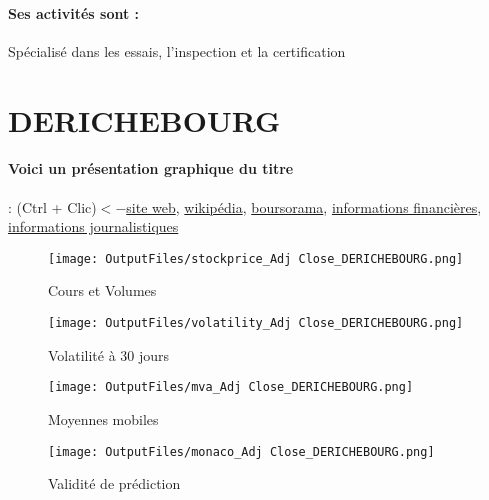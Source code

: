 \documentclass[11pt,a4paper]{report}%
\begin{document}
\paragraph{Ses activités sont : } Spécialisé dans les essais, l’inspection et la certification 
    
    \newpage

\section{DERICHEBOURG}

\paragraph{Voici un présentation graphique du titre} : (Ctrl + Clic)$<-$\href{https://www.derichebourg.com/fr/accueil/investisseurs/presentations}{site web}, \href{https://fr.wikipedia.org/wiki/Derichebourg}{wikipédia}, \href{https://www.boursorama.com/cours/1rPDBG}{boursorama}, \href{https://www.qwant.com/?q=site:https:%2f%2fwww.easybourse.com%2faction-societe%2fDERICHEBOURG&t=web&client=ext-firefox-hp}{informations financières}, \href{https://bourse.lerevenu.com/cours-de-bourse/fiche-valeur-synthese/DERICHEBOURG/DBG-FR}{informations journalistiques}
\begin{figure}[!htb]
   \begin{minipage}{0.5\textwidth}
     \centering
     \texttt{[image: OutputFiles/stockprice\_Adj Close\_DERICHEBOURG.png]}
     \caption{Cours et Volumes}\label{Fig:price_DERICHEBOURG}
   \end{minipage}\hfill
   \begin{minipage}{0.5\textwidth}
     \centering
     \texttt{[image: OutputFiles/volatility\_Adj Close\_DERICHEBOURG.png]}
     \caption{Volatilité à 30 jours}\label{Fig:volat_DERICHEBOURG}
   \end{minipage}
\end{figure}
\begin{figure}[!htb]
   \begin{minipage}{0.5\textwidth}
     \centering
     \texttt{[image: OutputFiles/mva\_Adj Close\_DERICHEBOURG.png]}
     \caption{Moyennes mobiles}\label{Fig:mva_DERICHEBOURG}
   \end{minipage}\hfill
   \begin{minipage}{0.5\textwidth}
     \centering
     \texttt{[image: OutputFiles/monaco\_Adj Close\_DERICHEBOURG.png]}
     \caption{Validité de prédiction}\label{Fig:prediction_DERICHEBOURG}
   \end{minipage}
\end{figure}
\end{document}
